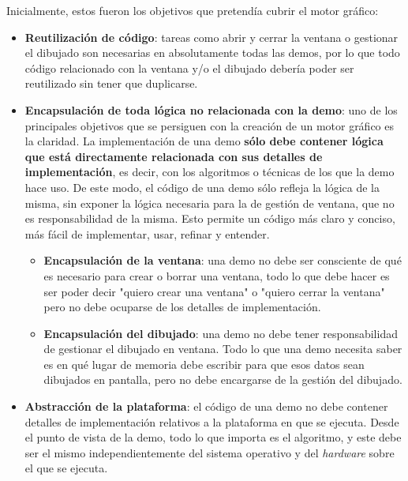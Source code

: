 Inicialmente, estos fueron los objetivos que pretendía cubrir el motor gráfico:
\begin{itemize}
	\item \textbf{Reutilización de código}: tareas como abrir y cerrar la ventana o gestionar el dibujado son necesarias en absolutamente todas las demos, por lo que todo código relacionado con la ventana y/o el dibujado debería poder ser reutilizado sin tener que duplicarse.
	\item \textbf{Encapsulación de toda lógica no relacionada con la demo}: uno de los principales objetivos que se persiguen con la creación de un motor gráfico es la claridad. La implementación de una demo \textbf{sólo debe contener lógica que está directamente relacionada con sus detalles de implementación}, es decir, con los algoritmos o técnicas de los que la demo hace uso. De este modo, el código de una demo sólo refleja la lógica de la misma, sin exponer la lógica necesaria para la de gestión de ventana, que no es responsabilidad de la misma. Esto permite un código más claro y conciso, más fácil de implementar, usar, refinar y entender.
		\begin{itemize}
			\item \textbf{Encapsulación de la ventana}: una demo no debe ser consciente de qué es necesario para crear o borrar una ventana, todo lo que debe hacer es ser poder decir "quiero crear una ventana" o "quiero cerrar la ventana" pero no debe ocuparse de los detalles de implementación.
			\item \textbf{Encapsulación del dibujado}: una demo no debe tener responsabilidad de gestionar el dibujado en ventana. Todo lo que una demo necesita saber es en qué lugar de memoria debe escribir para que esos datos sean dibujados en pantalla, pero no debe encargarse de la gestión del dibujado.
		\end{itemize}
	\item \textbf{Abstracción de la plataforma}: el código de una demo no debe contener detalles de implementación relativos a la plataforma en que se ejecuta. Desde el punto de vista de la demo, todo lo que importa es el algoritmo, y este debe ser el mismo independientemente del sistema operativo y del \emph{hardware} sobre el que se ejecuta.
\end{itemize}

